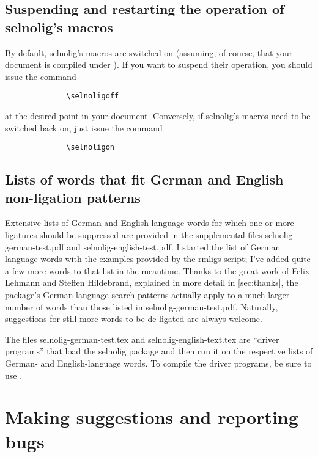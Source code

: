 \documentclass[11pt]{article}
\newcommand{\pkg}[1]{\textsf{#1}}
\begin{document}
\subsection[Suspending and restarting the operation of selnolig's macros]{Suspending and restarting the operation of \pkg{selnolig}'s macros} \label{sec:selnoligon}

By default, \pkg{selnolig}'s macros are switched on (assuming, of course, that your document is compiled under \LuaLaTeX). If you want to suspend their operation, you should issue the command
\begin{Verbatim}
              \selnoligoff
\end{Verbatim}
at the desired point in your document. Conversely, if \pkg{selnolig}'s macros need to be switched back on, just issue the command
\begin{Verbatim}
              \selnoligon
\end{Verbatim}


\subsection{Lists of words that fit German and English non-ligation patterns}

Extensive lists of German and English language words for which one or more ligatures should be suppressed are provided in the supplemental files \pkg{selnolig-german-test.pdf} and \pkg{selnolig-english-test.pdf}. I started the list of German language words with the examples provided by the \pkg{rmligs} script; I've added quite a few more words to that list in the meantime. Thanks to the great work of Felix Lehmann and Steffen Hildebrand, explained in more detail in \cref{sec:thanks}, the package's German language search patterns actually apply to a much larger number of words than those listed in \pkg{selnolig-german-test.pdf}. Naturally, suggestions for still more words to be de-ligated are always welcome.

The files \pkg{selnolig-german-test.tex} and \pkg{selnolig-english-text.tex} are \enquote{driver programs} that load the \pkg{selnolig} package and then run it on the respective lists of German- and English-language words. To compile the driver programs, be sure to use \LuaLaTeX.


\section{Making suggestions and reporting bugs}
\end{document}
